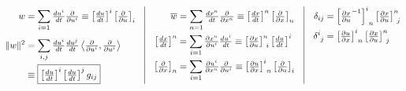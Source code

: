\documentclass[12pt]{article}
\begin{document}
\vspace{10pt}
\(
	\begin{aligned}[t]
		w & = \sum_{i=1} \tfrac{du^i}{dt} \tfrac{\partial}{\partial u^i} 
			\equiv \left[\tfrac{du}{dt}\right]^i \left[\tfrac{\partial}{\partial u}\right]_i 
			\\[5pt]	
		\Vert w \Vert^2 & = \sum_{i,j} \tfrac{du^i}{dt} \tfrac{du^j}{dt} 
			\left< \tfrac{\partial}{\partial u^i} , \tfrac{\partial}{\partial u^i} \right>
			\\
		& \equiv \boxed{ \left[\tfrac{du}{dt}\right]^i \left[\tfrac{du}{dt}\right]^j g_{ij} }
	\end{aligned}
	\hspace{10pt} \vline \hspace{10pt}
	\begin{aligned}[t]
		\overline{w} & = \sum_{n=1} \tfrac{dx^n}{dt} \tfrac{\partial}{\partial x^n} 
			\equiv \left[\tfrac{dx}{dt}\right]^n \left[\tfrac{\partial}{\partial x}\right]_n 
			\\
		\left[\tfrac{dx}{dt}\right]^n & = \sum_{i=1} \tfrac{\partial x^n}{\partial u^i} \tfrac{du^i}{dt}
			\equiv \left[ \tfrac{\partial x}{\partial u} \right]^n_{\ i} \left[\tfrac{du}{dt}\right]^i 
			\\
		\left[\tfrac{\partial}{\partial x}\right]_n & = \sum_{i=1} \tfrac{\partial u^i}{\partial x^n} \tfrac{\partial}{\partial u^i} 
			\equiv \left[ \tfrac{\partial u}{\partial x} \right]^i_{\ n} \left[\tfrac{\partial}{\partial u}\right]_i 
	\end{aligned}
	\hspace{10pt} \vline \hspace{10pt}
	\begin{aligned}[t]
		\delta_{ij} & = \left[ \tfrac{\partial x}{\partial u}^{-1} \right]^i_{\ n} \left[ \tfrac{\partial x}{\partial u} \right]^n_{\ j}
			\\
		\delta^i_{\ j} & = \left[ \tfrac{\partial u}{\partial x} \right]^i_{\ n} \left[ \tfrac{\partial x}{\partial u} \right]^n_{\ j} 
	\end{aligned}
\)
\end{document}
